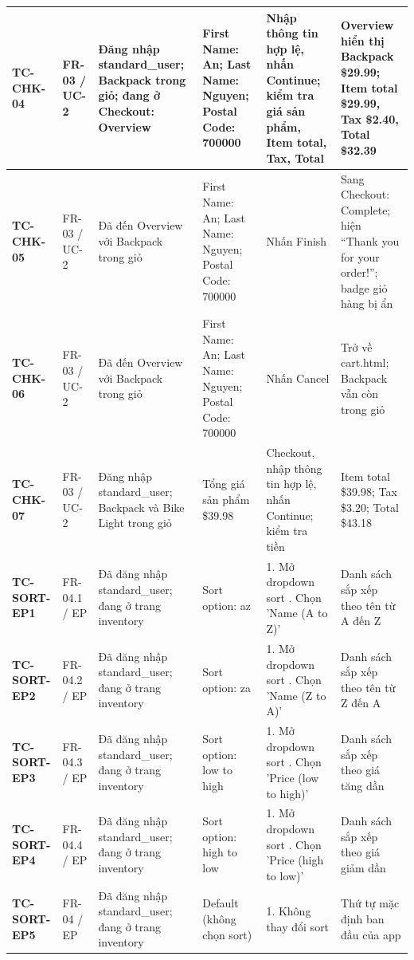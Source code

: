 {\begin{longtable}{|L{3.5cm}|L{1.9cm}|L{4.6cm}|L{3.7cm}|L{5.1cm}|L{5.1cm}|}
\hline
\textbf{\mbox{TC-CHK-04}} & FR-03 / UC-2 & Đăng nhập standard\_\allowbreak{}user; Backpack trong giỏ; đang ở Checkout: Overview & First Name: An; Last Name: Nguyen; Postal Code: 700000 & Nhập thông tin hợp lệ, nhấn Continue; kiểm tra giá sản phẩm, Item total, Tax, Total & Overview hiển thị Backpack \$29.99; Item total \$29.99, Tax \$2.40, Total \$32.39 \\
\hline
\textbf{\mbox{TC-CHK-05}} & FR-03 / UC-2 & Đã đến Overview với Backpack trong giỏ & First Name: An; Last Name: Nguyen; Postal Code: 700000 & Nhấn Finish & Sang Checkout: Complete; hiện ``Thank you for your order!''; badge giỏ hàng bị ẩn \\
\hline
\textbf{\mbox{TC-CHK-06}} & FR-03 / UC-2 & Đã đến Overview với Backpack trong giỏ & First Name: An; Last Name: Nguyen; Postal Code: 700000 & Nhấn Cancel & Trở về cart.html; Backpack vẫn còn trong giỏ \\
\hline
\textbf{\mbox{TC-CHK-07}} & FR-03 / UC-2 & Đăng nhập standard\_\allowbreak{}user; Backpack và Bike Light trong giỏ & Tổng giá sản phẩm \$39.98 & Checkout, nhập thông tin hợp lệ, nhấn Continue; kiểm tra tiền & Item total \$39.98; Tax \$3.20; Total \$43.18 \\
\hline
\textbf{\mbox{TC-SORT-EP1}} & FR-04.1 / EP & Đã đăng nhập standard\_\allowbreak{}user; đang ở trang inventory & Sort option: az & 1. Mở dropdown sort . Chọn 'Name (A to Z)' & Danh sách sắp xếp theo tên từ A đến Z \\
\hline
\textbf{\mbox{TC-SORT-EP2}} & FR-04.2 / EP & Đã đăng nhập standard\_\allowbreak{}user; đang ở trang inventory & Sort option: za & 1. Mở dropdown sort . Chọn 'Name (Z to A)' & Danh sách sắp xếp theo tên từ Z đến A \\
\hline
\textbf{\mbox{TC-SORT-EP3}} & FR-04.3 / EP & Đã đăng nhập standard\_\allowbreak{}user; đang ở trang inventory & Sort option: low to high & 1. Mở dropdown sort . Chọn 'Price (low to high)' & Danh sách sắp xếp theo giá tăng dần \\
\hline
\textbf{\mbox{TC-SORT-EP4}} & FR-04.4 / EP & Đã đăng nhập standard\_\allowbreak{}user; đang ở trang inventory & Sort option: high to low & 1. Mở dropdown sort . Chọn 'Price (high to low)' & Danh sách sắp xếp theo giá giảm dần \\
\hline
\textbf{\mbox{TC-SORT-EP5}} & FR-04 / EP & Đã đăng nhập standard\_\allowbreak{}user; đang ở trang inventory & Default (không chọn sort) & 1. Không thay đổi sort & Thứ tự mặc định ban đầu của app \\

\end{longtable}}
